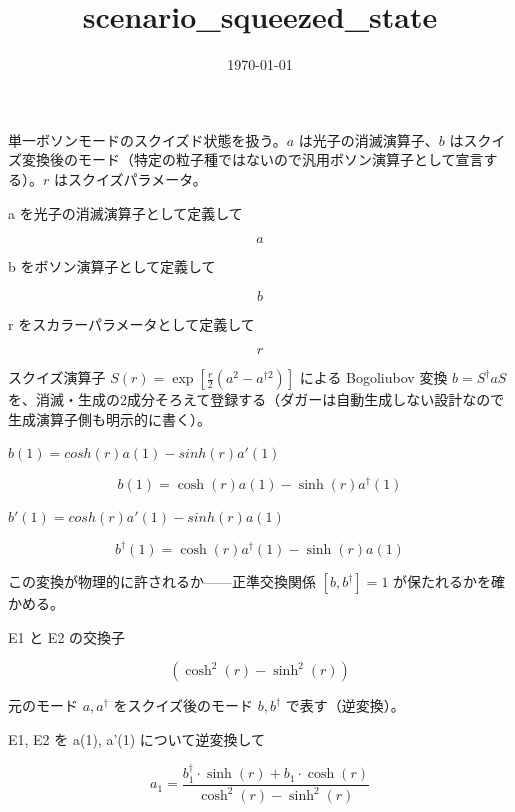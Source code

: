 \documentclass[dvipdfmx,a4paper,11pt]{jsarticle}
\title{scenario\_squeezed\_state}
\date{\today}
\begin{document}
\maketitle

単一ボソンモードのスクイズド状態を扱う。$a$ は光子の消滅演算子、$b$ はスクイズ変換後のモード（特定の粒子種ではないので汎用ボソン演算子として宣言する）。$r$ はスクイズパラメータ。

a を光子の消滅演算子として定義して

\[
  a
\]

b をボソン演算子として定義して

\[
  b
\]

r をスカラーパラメータとして定義して

\[
  r
\]

スクイズ演算子 $S(r)=\exp[\frac{r}{2}(a^2-a^{\dagger 2})]$ による Bogoliubov 変換 $b=S^\dagger a S$ を、消滅・生成の2成分そろえて登録する（ダガーは自動生成しない設計なので生成演算子側も明示的に書く）。

$b(1) = cosh(r) a(1) - sinh(r) a'(1)$

\begin{equation}
  b(1) = \cosh(r) a(1) - \sinh(r) a^{\dagger}(1)
  \label{eq:E1}
\end{equation}

$b'(1) = cosh(r) a'(1) - sinh(r) a(1)$

\begin{equation}
  b^{\dagger}(1) = \cosh(r) a^{\dagger}(1) - \sinh(r) a(1)
  \label{eq:E2}
\end{equation}

この変換が物理的に許されるか——正準交換関係 $[b,b^\dagger]=1$ が保たれるかを確かめる。

E1 と E2 の交換子

\begin{equation}
  \left(\cosh^{2}\left( r \right) - \sinh^{2}\left( r \right)\right)
  \label{eq:E3}
\end{equation}

元のモード $a, a^\dagger$ をスクイズ後のモード $b, b^\dagger$ で表す（逆変換）。

E1, E2 を a(1), a'(1) について逆変換して

\begin{equation}
  a_{1} = \frac{b^{\dagger}_{1} \cdot \sinh\left( r \right) + b_{1} \cdot \cosh\left( r \right)}{\cosh^{2}\left( r \right) - \sinh^{2}\left( r \right)}
  \label{eq:E4}
\end{equation}
\end{document}
